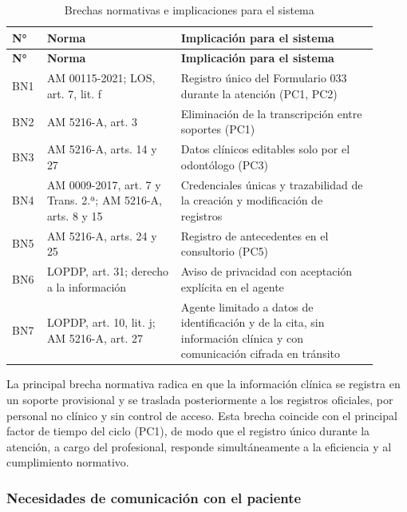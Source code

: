 \begingroup
\fontsize{9}{11}\selectfont
\renewcommand{\arraystretch}{1.2}
\setlength{\LTpre}{0pt}\setlength{\LTpost}{6pt}
\setlength{\tabcolsep}{4pt}
\begin{longtable}{|>{\centering\arraybackslash}p{0.07\linewidth}|p{0.34\linewidth}|p{0.50\linewidth}|}
\caption{Brechas normativas e implicaciones para el sistema}
\label{tab:brechas_normativas} \\
\hline
\textbf{N°} & \textbf{Norma} & \textbf{Implicación para el sistema} \\ \hline
\endfirsthead
\hline
\textbf{N°} & \textbf{Norma} & \textbf{Implicación para el sistema} \\ \hline
\endhead
BN1 & AM 00115-2021; LOS, art. 7, lit. f & Registro único del Formulario 033 durante la atención (PC1, PC2) \\ \hline
BN2 & AM 5216-A, art. 3 & Eliminación de la transcripción entre soportes (PC1) \\ \hline
BN3 & AM 5216-A, arts. 14 y 27 & Datos clínicos editables solo por el odontólogo (PC3) \\ \hline
BN4 & AM 0009-2017, art. 7 y Trans. 2.ª; AM 5216-A, arts. 8 y 15 & Credenciales únicas y trazabilidad de la creación y modificación de registros \\ \hline
BN5 & AM 5216-A, arts. 24 y 25 & Registro de antecedentes en el consultorio (PC5) \\ \hline
BN6 & LOPDP, art. 31; derecho a la información & Aviso de privacidad con aceptación explícita en el agente \\ \hline
BN7 & LOPDP, art. 10, lit. j; AM 5216-A, art. 27 & Agente limitado a datos de identificación y de la cita, sin información clínica y con comunicación cifrada en tránsito \\ \hline
\end{longtable}
\endgroup

La principal brecha normativa radica en que la información clínica se registra en un soporte provisional y se traslada posteriormente a los registros oficiales, por personal no clínico y sin control de acceso. Esta brecha coincide con el principal factor de tiempo del ciclo (PC1), de modo que el registro único durante la atención, a cargo del profesional, responde simultáneamente a la eficiencia y al cumplimiento normativo.

\subsubsection{Necesidades de comunicación con el paciente}

